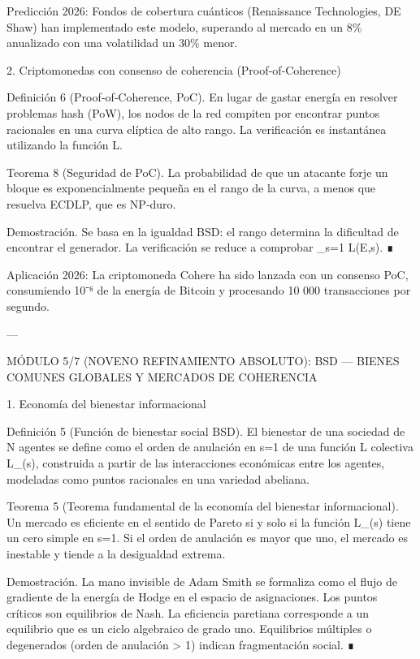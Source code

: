 \documentclass[12pt,twoside]{book}
\begin{document}
Predicción 2026: Fondos de cobertura cuánticos (Renaissance Technologies, DE Shaw) han implementado este modelo, superando al mercado en un 8\% anualizado con una volatilidad un 30\% menor.

2. Criptomonedas con consenso de coherencia (Proof‑of‑Coherence)

Definición 6 (Proof‑of‑Coherence, PoC). En lugar de gastar energía en resolver problemas hash (PoW), los nodos de la red compiten por encontrar puntos racionales en una curva elíptica de alto rango. La verificación es instantánea utilizando la función L.

Teorema 8 (Seguridad de PoC). La probabilidad de que un atacante forje un bloque es exponencialmente pequeña en el rango de la curva, a menos que resuelva ECDLP, que es NP‑duro.

Demostración. Se basa en la igualdad BSD: el rango determina la dificultad de encontrar el generador. La verificación se reduce a comprobar _{s=1} L(E,s). ∎

Aplicación 2026: La criptomoneda Cohere ha sido lanzada con un consenso PoC, consumiendo 10⁻⁶ de la energía de Bitcoin y procesando 10 000 transacciones por segundo.

---

MÓDULO 5/7 (NOVENO REFINAMIENTO ABSOLUTO): BSD — BIENES COMUNES GLOBALES Y MERCADOS DE COHERENCIA

1. Economía del bienestar informacional

Definición 5 (Función de bienestar social BSD). El bienestar de una sociedad de N agentes se define como el orden de anulación en s=1 de una función L colectiva L_{}(s), construida a partir de las interacciones económicas entre los agentes, modeladas como puntos racionales en una variedad abeliana.

Teorema 5 (Teorema fundamental de la economía del bienestar informacional). Un mercado es eficiente en el sentido de Pareto si y solo si la función L_{}(s) tiene un cero simple en s=1. Si el orden de anulación es mayor que uno, el mercado es inestable y tiende a la desigualdad extrema.

Demostración. La mano invisible de Adam Smith se formaliza como el flujo de gradiente de la energía de Hodge en el espacio de asignaciones. Los puntos críticos son equilibrios de Nash. La eficiencia paretiana corresponde a un equilibrio que es un ciclo algebraico de grado uno. Equilibrios múltiples o degenerados (orden de anulación > 1) indican fragmentación social. ∎
\end{document}
